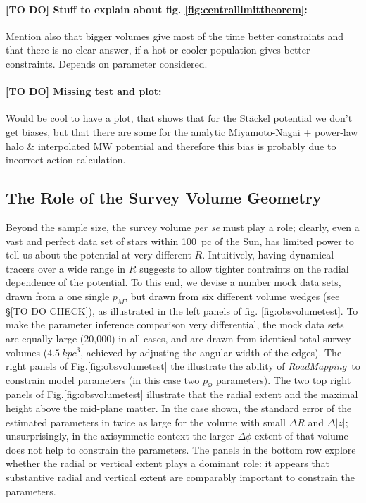 \documentclass[12pt,preprint]{aastex}
\newcommand{\pmodel}{\ensuremath{p_M}}
\newcommand{\RM}{{\sl RoadMapping~}}
\begin{document}
 \paragraph{[TO DO] Stuff to explain about fig. \ref{fig:centrallimittheorem}:} Mention also that bigger volumes give most of the time better constraints and that there is no clear answer, if a hot or cooler population gives better constraints. Depends on parameter considered.


\paragraph{[TO DO] Missing test and plot:}  Would be cool to have a plot, that shows that for the St\"ackel potential we don't get biases, but that there are some for the analytic Miyamoto-Nagai + power-law halo \& interpolated MW potential and therefore this bias is probably due to incorrect action calculation.

\subsection{The Role of the Survey Volume Geometry} \label{sec:obsvolume}

Beyond the sample size, the survey volume {\it per se} must play a role; clearly, even a vast and perfect data set of stars within 100~pc of the Sun, has limited power to tell us about the potential at very different $R$. Intuitively, having dynamical tracers over a wide range in $R$ suggests to allow tighter contraints on the radial dependence of the potential. To this end, we devise a number mock data sets, drawn from a one single \pmodel , but drawn from six different volume wedges (see \S [TO DO CHECK]), as illustrated in the left panels of fig. \ref{fig:obsvolumetest}. To make the parameter inference comparison very differential, the mock data sets are equally large (20,000) in all cases, and are drawn from identical total survey volumes ($4.5~kpc^3$, achieved by adjusting the angular width of the edges). The right panels of Fig.\ref{fig:obsvolumetest} the illustrate the ability of \RM to constrain model parameters (in this case two $p_\Phi$ parameters). The two top right panels of Fig.\ref{fig:obsvolumetest} illustrate that the radial extent and the maximal height above the mid-plane matter. In the case shown, the standard error of the estimated parameters in twice as large for the volume with small $\Delta R$ and $\Delta |z|$; unsurprisingly, in the axisymmetic context the larger $\Delta\phi$ extent of that volume does not help to constrain the parameters. The panels in the bottom row explore whether the radial or vertical extent plays a dominant role: it appears that substantive radial and vertical extent are comparably important to constrain the parameters. 
\end{document}
